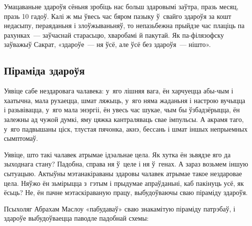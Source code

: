 
Умацаваньне здароўя сёньня зробіць нас больш здаровымі заўтра, празь месяц, празь 10 гадоў. Калі ж мы ўвесь час бяром пазыку ў~свайго здароўя за кошт недасыпу, пераяданьня і злоўжываньняў, то непазьбежна прыйдзе час плаціць па рахунках~--- заўчаснай старасьцю, хваробамі й пакутай. Як па-філязофску заўважыў Сакрат, «здароўе~--- ня ўсё, але ўсё без здароўя~--- нішто».

\subsection*{Піраміда здароўя}

Уявіце сабе нездаровага чалавека: у~яго лішняя вага, ён харчуецца абы-чым і хаатычна, мала рухаецца, шмат ляжыць, у~яго няма жаданьня і настрою вучыцца і разьвівацца, у~яго мала энэргіі, ён увесь час шукае, чым бы ўзбадзёрыцца, ён залежны ад чужой думкі, яму цяжка кантраляваць свае імпульсы. А акрамя таго, у~яго падвышаны ціск, тлустая пячонка, акнэ, бессань і шмат іншых непрыемных сымптомаў.

Уявіце, што такі чалавек атрымае ідэальнае цела. Як хутка ён зьвядзе яго да зыходнага стану? Падобна, справа ня ў~целе і ня ў~генах. А зараз возьмем іншую сытуацыю. Актыўны мэтанакіраваны здаровы чалавек атрымае такое нездаровае цела. Няўжо ён зьмірыцца з~гэтым і прыдумае апраўданьні, каб пакінуць усё, як ёсьць? Не, ён пачне мэтаскіраваную працу, выбудоўваючы сваю піраміду здароўя.

Псыхоляг Абрахам Маслоу «пабудаваў» сваю знакамітую піраміду патрэбаў, і здароўе выбудоўваецца паводле падобнай схемы:

